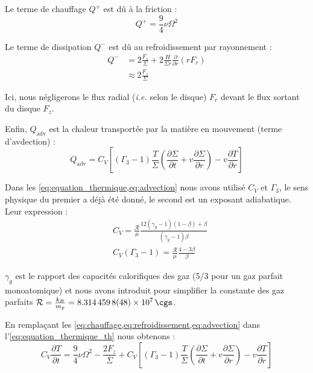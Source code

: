 Le terme de chauffage $Q^+$ est dû à la friction :
\begin{equation}
    \label{eq:chauffage}
    Q^+ = \frac{\num{9}}{\num{4}} \nu \Omega^{\num{2}}
\end{equation}

Le terme de dissipation $Q^-$ est dû au refroidissement par rayonnement :
\begin{align}
    Q^- &= \num{2} \frac{F_z}{\Sigma} + \num{2} \frac{H}{\Sigma r} \frac{\partial}{\partial r} \left(r F_r\right) \\
    \label{eq:refroidissement}
        &\approx \num{2} \frac{F_z}{\Sigma}
\end{align}

Ici, nous négligerons le flux radial (\textit{i.e.} selon le disque) $F_r$
devant le flux sortant du disque $F_z$.

Enfin, $Q_\mathrm{adv}$ est la chaleur transportée par la matière en mouvement
(terme d’avdection) : 
\begin{equation}
    \label{eq:advection}
    Q_\mathrm{adv} = C_V \left[ (\Gamma_{\num{3}} - \num{1}) \frac{T}{\Sigma} \left( \frac{\partial \Sigma}{\partial t} + v \frac{\partial \Sigma}{\partial r}  \right) - v \frac{\partial T}{\partial r} \right]
\end{equation}

Dans les \cref{eq:equation_thermique,eq:advection} nous avons utilisé $C_V$ et
$\Gamma_3$, le sens physique du premier a déjà été donné, le second est un
exposant adiabatique. Leur expression :
\begin{align}
    &C_V = \frac{\mathcal{R}}{\mu} \frac{\num{12} (\gamma_g - \num{1})(\num{1} - \beta) + \beta}{(\gamma_g - \num{1}) \beta} \\
    &C_V (\Gamma_{\num{3}} - \num{1}) = \frac{\mathcal{R}}{\mu} \frac{\num{4} - \num{3}\beta}{\beta}
\end{align}

$\gamma_g$ est le rapport des capacités calorifiques des gaz (\num{5/3} pour un
gaz parfait monoatomique) et nous avons introduit pour simplifier la constante
des gaz parfaits $\mathcal{R} = \frac{k_B}{m_p} = \SI{8.3144598(48)d7}{\cgs}$.

En remplaçant les \cref{eq:chauffage,eq:refroidissement,eq:advection} dans
l’\cref{eq:equation_thermique_th} nous obtenons :
\begin{equation}
    \label{eq:equation_thermique}
    C_V \frac{\partial T}{\partial t} = \frac{\num{9}}{\num{4}} \nu \Omega^{\num{2}} - \frac{\num{2} F_z}{\Sigma} + C_V \left[ (\Gamma_{\num{3}} - \num{1}) \frac{T}{\Sigma} \left( \frac{\partial \Sigma}{\partial t} + v \frac{\partial \Sigma}{\partial r} \right) - v \frac{\partial T}{\partial r} \right]
\end{equation}

